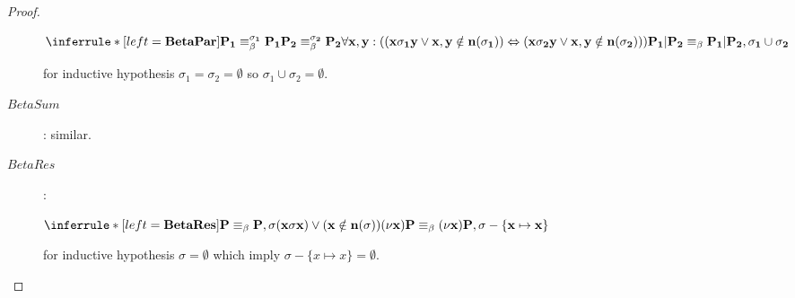 \begin{lemma}
\begin{proof}
\begin{description}
\begin{center}
  	  $\inferrule*[left=\bf{BetaPar}]{
	      P_{1}\equiv_{\beta}^{\sigma_{1}}P_{1}
	    \\
	      P_{2}\equiv_{\beta}^{\sigma_{2}}P_{2}
	    \\
	      \forall x,y: ((x\sigma_{1}y \vee x,y\notin n(\sigma_{1})) \Leftrightarrow (x\sigma_{2}y \vee x,y\notin n(\sigma_{2})))
	  }{
	      P_{1}|P_{2}\equiv_{\beta}P_{1}|P_{2},
	    \\
	      \sigma_{1} \cup \sigma_{2}
	  }$
	\end{center}
	for inductive hypothesis $\sigma_{1}=\sigma_{2}=\emptyset$ so $\sigma_{1} \cup \sigma_{2}=\emptyset$.
      \item[$BetaSum$]: similar.
      \item[$BetaRes$]: 
	\begin{center}
	  $\inferrule*[left=\bf{BetaRes}]{
	      P\equiv_{\beta}P,
	    \\
	      \sigma
	    \\
	      (x\sigma x) \vee (x\notin n(\sigma))
	  }{
	      (\nu x)P\equiv_{\beta}(\nu x)P,
	    \\
	      \sigma - \{x\mapsto x\}
	  }$
	\end{center}
	for inductive hypothesis $\sigma=\emptyset$ which imply $\sigma - \{x\mapsto x\}=\emptyset$.
    \end{description}
  \end{proof}
\end{lemma}

